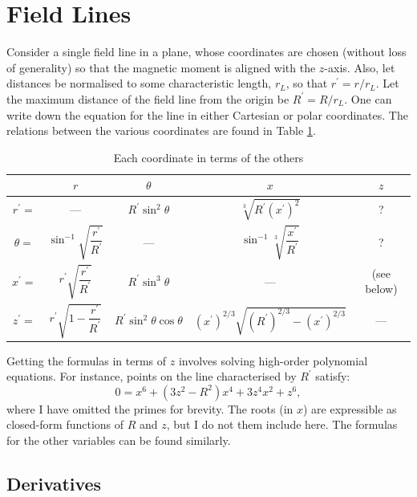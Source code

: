 \documentclass{book}
\begin{document}
\section{Field Lines}

Consider a single field line in a plane, whose coordinates are chosen (without loss of generality) so that the magnetic moment is aligned with the $z$-axis.
Also, let distances be normalised to some characteristic length, $r_L$, so that $r^\prime = r/r_L$.
Let the maximum distance of the field line from the origin be $R^\prime = R/r_L$.
One can write down the equation for the line in either Cartesian or polar coordinates.
The relations between the various coordinates are found in Table \ref{tbl:dipolar}.
\begin{table}[!ht]
    \centering
    \caption{Each coordinate in terms of the others}
    \label{tbl:dipolar}
    \begin{tabular}{c|cccc}
        & $r$ & $\theta$ & $x$ & $z$ \\[5pt]
        \hline
        $r^\prime =$ & --- & $R^\prime\sin^2\theta$ & $\sqrt[3]{R^\prime (x^\prime)^2}$ & ? \\[8pt]
        $\theta =$   & $\sin^{-1}\sqrt{\dfrac{r^\prime}{R^\prime}}$ & --- & $\sin^{-1}\sqrt[3]{\dfrac{x^\prime}{R^\prime}}$ & ? \\[8pt]
        $x^\prime =$ & $r^\prime\sqrt{\dfrac{r^\prime}{R^\prime}}$ & $R^\prime\sin^3\theta$ & --- & (see below) \\[8pt]
        $z^\prime =$ & $r^\prime\sqrt{1-\dfrac{r^\prime}{R^\prime}}$ & $R^\prime\sin^2\theta\cos\theta$ & $(x^\prime)^{2/3} \sqrt{(R^\prime)^{2/3} - (x^\prime)^{2/3}}$ & ---
    \end{tabular}
\end{table}

Getting the formulas in terms of $z$ involves solving high-order polynomial equations.
For instance, points on the line characterised by $R^\prime$ satisfy:
\begin{equation}
    0 = x^6 + (3z^2 - R^2)x^4 + 3z^4x^2 + z^6,
\end{equation}
where I have omitted the primes for brevity.
The roots (in $x$) are expressible as closed-form functions of $R$ and $z$, but I do not them include here.
The formulas for the other variables can be found similarly.

\subsection{Derivatives}
\end{document}
